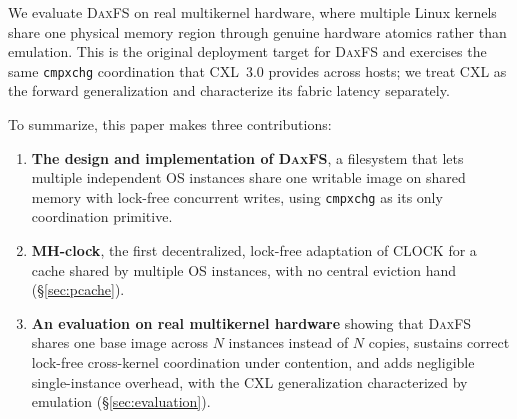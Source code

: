 \documentclass[letterpaper,twocolumn,10pt]{article}
\newcommand{\daxfs}{\textsc{DaxFS}\xspace}
\begin{document}
We evaluate \daxfs on real multikernel hardware, where multiple Linux
kernels share one physical memory region through genuine hardware
atomics rather than emulation.  This is the original deployment target
for \daxfs and exercises the same \texttt{cmpxchg} coordination that
CXL~3.0 provides across hosts; we treat CXL as the forward
generalization and characterize its fabric latency separately.

To summarize, this paper makes three contributions:

\begin{enumerate}
\item \textbf{The design and implementation of \daxfs}, a filesystem
  that lets multiple independent OS instances share one writable image
  on shared memory with lock-free concurrent writes, using
  \texttt{cmpxchg} as its only coordination primitive.

\item \textbf{MH-clock}, the first decentralized, lock-free adaptation
  of CLOCK for a cache shared by multiple OS instances, with no central
  eviction hand (\S\ref{sec:pcache}).

\item \textbf{An evaluation on real multikernel hardware} showing that
  \daxfs shares one base image across $N$ instances instead of $N$
  copies, sustains correct lock-free cross-kernel coordination under
  contention, and adds negligible single-instance overhead, with the
  CXL generalization characterized by emulation
  (\S\ref{sec:evaluation}).
\end{enumerate}
\end{document}
